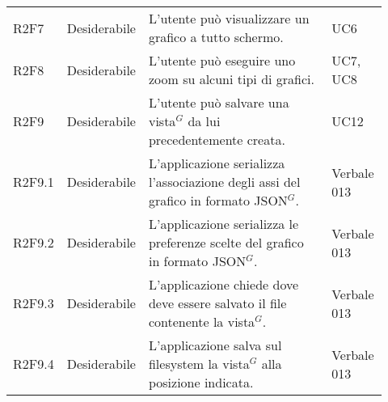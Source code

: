 {\begin{longtable}{p{0.12\linewidth}p{0.15\linewidth}p{0.50\linewidth}p{0.15\linewidth}}
    \rowcolor[RGB]{216, 235, 171}
    R2F7 & Desiderabile & L'utente può visualizzare un grafico a tutto schermo. & UC6\\
    \rowcolor[RGB]{233, 245, 206}
    R2F8 & Desiderabile & L'utente può eseguire uno zoom su alcuni tipi di grafici. & UC7, UC8\\
    \rowcolor[RGB]{216, 235, 171}
    R2F9 & Desiderabile & L'utente può salvare una vista$^{G}$ da lui precedentemente creata. & UC12\\
    \rowcolor[RGB]{233, 245, 206}
    R2F9.1 & Desiderabile & L'applicazione serializza l'associazione degli assi del grafico in formato JSON$^{G}$.& Verbale 013 \\
    \rowcolor[RGB]{216, 235, 171}
    R2F9.2 & Desiderabile & L'applicazione serializza le preferenze scelte del grafico in formato JSON$^{G}$.& Verbale 013 \\
    \rowcolor[RGB]{233, 245, 206}
    R2F9.3 & Desiderabile & L'applicazione chiede dove deve essere salvato il file  contenente la vista$^{G}$.& Verbale 013 \\
    \rowcolor[RGB]{216, 235, 171}
    R2F9.4 & Desiderabile & L'applicazione salva sul filesystem la vista$^{G}$ alla posizione indicata.& Verbale 013 \\


\end{longtable}}
